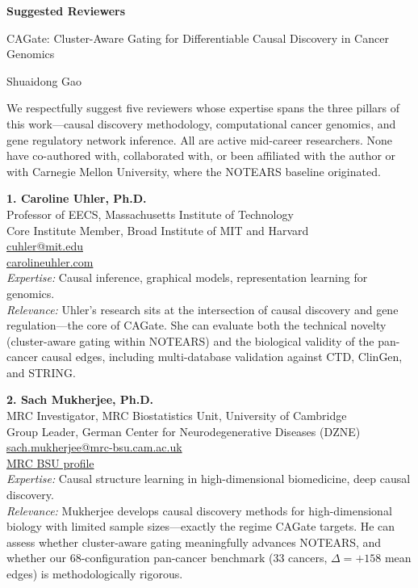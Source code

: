 \documentclass[12pt]{article}
\begin{document}
\begin{center}
{\Large\textbf{Suggested Reviewers}}
\vspace{4pt}

{\normalsize CAGate: Cluster-Aware Gating for Differentiable Causal Discovery in Cancer Genomics}
\vspace{2pt}

{\small Shuaidong Gao}
\end{center}

\vspace{0.8cm}

\noindent We respectfully suggest five reviewers whose expertise spans the three pillars of this work---causal discovery methodology, computational cancer genomics, and gene regulatory network inference. All are active mid-career researchers. None have co-authored with, collaborated with, or been affiliated with the author or with Carnegie Mellon University, where the NOTEARS baseline originated.

\vspace{0.5cm}

\noindent\textbf{1. Caroline Uhler, Ph.D.}\\
Professor of EECS, Massachusetts Institute of Technology\\
Core Institute Member, Broad Institute of MIT and Harvard\\
\href{mailto:cuhler@mit.edu}{cuhler@mit.edu}\\
\href{https://www.carolineuhler.com}{carolineuhler.com}\\[4pt]
\textit{Expertise:} Causal inference, graphical models, representation learning for genomics.\\
\textit{Relevance:} Uhler's research sits at the intersection of causal discovery and gene regulation---the core of CAGate. She can evaluate both the technical novelty (cluster-aware gating within NOTEARS) and the biological validity of the pan-cancer causal edges, including multi-database validation against CTD, ClinGen, and STRING.

\vspace{0.4cm}

\noindent\textbf{2. Sach Mukherjee, Ph.D.}\\
MRC Investigator, MRC Biostatistics Unit, University of Cambridge\\
Group Leader, German Center for Neurodegenerative Diseases (DZNE)\\
\href{mailto:sach.mukherjee@mrc-bsu.cam.ac.uk}{sach.mukherjee@mrc-bsu.cam.ac.uk}\\
\href{https://www.mrc-bsu.cam.ac.uk/people/in-alphabetical-order/h-to-m/sach-mukherjee/}{MRC BSU profile}\\[4pt]
\textit{Expertise:} Causal structure learning in high-dimensional biomedicine, deep causal discovery.\\
\textit{Relevance:} Mukherjee develops causal discovery methods for high-dimensional biology with limited sample sizes---exactly the regime CAGate targets. He can assess whether cluster-aware gating meaningfully advances NOTEARS, and whether our 68-configuration pan-cancer benchmark (33 cancers, $\Delta = +158$ mean edges) is methodologically rigorous.
\end{document}
